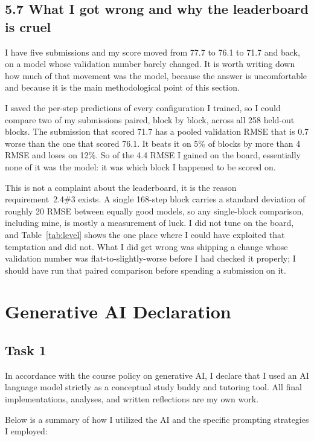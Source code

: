\documentclass[11pt,letterpaper]{article}
\begin{document}
\subsection*{5.7 What I got wrong and why the leaderboard is cruel}

I have five submissions and my score moved from 77.7 to 76.1 to 71.7 and back, on a model whose validation number barely changed. It is worth writing down how much of that movement was the model, because the answer is uncomfortable and because it is the main methodological point of this section.

I saved the per-step predictions of every configuration I trained, so I could compare two of my submissions {paired}, block by block, across all 258 held-out blocks. The submission that scored 71.7 has a pooled validation RMSE that is 0.7 {worse} than the one that scored 76.1. It beats it on 5\% of blocks by more than 4 RMSE and loses on 12\%. So of the 4.4 RMSE I gained on the board, essentially none of it was the model: it was which block I happened to be scored on.

This is not a complaint about the leaderboard, it is the reason requirement~2.4\#3 exists. A single 168-step block carries a standard deviation of roughly 20 RMSE between equally good models, so any single-block comparison, including mine, is mostly a measurement of luck. I did not tune on the board, and Table~\ref{tab:level} shows the one place where I could have exploited that temptation and did not. What I did get wrong was shipping a change whose validation number was flat-to-slightly-worse before I had checked it properly; I should have run that paired comparison before spending a submission on it.

\vspace{20pt}


\section*{Generative AI Declaration}

\subsection*{Task 1}
In accordance with the course policy on generative AI, I declare that I used an AI language model strictly as a conceptual study buddy and tutoring tool. All final implementations, analyses, and written reflections are my own work. 

Below is a summary of how I utilized the AI and the specific prompting strategies I employed:
\end{document}
